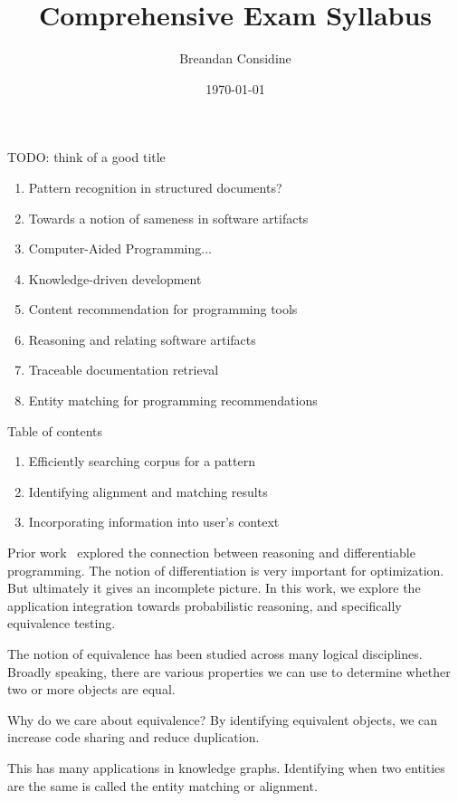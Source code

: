 \documentclass[11pt]{article}
\title{Comprehensive Exam Syllabus}
\author{Breandan Considine}
\date{\today}
\begin{document}
    \maketitle

    \tableofcontents

    TODO: think of a good title

    \begin{enumerate}
    \item Pattern recognition in structured documents?
    \item Towards a notion of sameness in software artifacts
    \item Computer-Aided Programming...
    \item Knowledge-driven development
    \item Content recommendation for programming tools
    \item Reasoning and relating software artifacts
    \item Traceable documentation retrieval
    \item Entity matching for programming recommendations
    \end{enumerate}

    Table of contents
    \begin{enumerate}
    \item Efficiently searching corpus for a pattern
    \item Identifying alignment and matching results
    \item Incorporating information into user's context
    \end{enumerate}

    Prior work~\citep{considine2019kotlingrad,considine2019programming} explored the connection between reasoning and differentiable programming. The notion of differentiation is very important for optimization. But ultimately it gives an incomplete picture. In this work, we explore the application integration towards probabilistic reasoning, and specifically equivalence testing.

    The notion of equivalence has been studied across many logical disciplines. Broadly speaking, there are various properties we can use to determine whether two or more objects are equal.

    Why do we care about equivalence? By identifying equivalent objects, we can increase code sharing and reduce duplication.

    This has many applications in knowledge graphs. Identifying when two entities are the same is called the entity matching or alignment.
\end{document}
